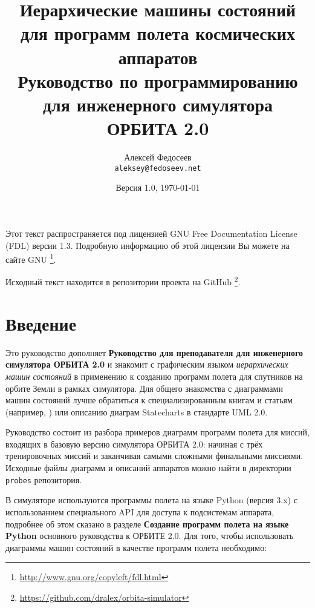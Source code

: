 \documentclass[12pt,a4paper]{article}
\begin{document}
\title{%
  \textbf{Иерархические машины состояний для программ полета космических аппаратов} \\
    Руководство по программированию для инженерного симулятора ОРБИТА 2.0}

\author{
  Алексей Федосеев\\
  \texttt{aleksey@fedoseev.net}
}

\date{Версия 1.0, \today}

\maketitle

Этот текст распространяется под лицензией GNU Free Documentation License (FDL) версии
1.3. Подробную информацию об этой лицензии Вы можете на сайте GNU
\footnote{\url{http://www.gnu.org/copyleft/fdl.html}}.

Исходный текст находится в репозитории проекта на GitHub
\footnote{\url{https://github.com/dralex/orbita-simulator}}.

\tableofcontents

\clearpage
\section{Введение}

Это руководство дополняет \textbf{Руководство для преподавателя для инженерного симулятора
  ОРБИТА 2.0} и знакомит с графическим языком \emph{иерархических машин состояний} в
применению к созданию программ полета для спутников на орбите Земли в рамках
симулятора. Для общего знакомства с диаграммами машин состояний лучше обратиться к
специализированным книгам и статьям (например, \cite{CRASHCOURSE}) или описанию диаграм
Statecharts в стандарте UML 2.0.

Руководство состоит из разбора примеров диаграмм программ полета для миссий, входящих в
базовую версию симулятора ОРБИТА 2.0: начиная с трёх тренировочных миссий и заканчивая
самыми сложными финальными миссиями. Исходные файлы диаграмм и описаний аппаратов можно
найти в директории \verb'probes' репозитория.

В симуляторе используются программы полета на языке Python (версия 3.x) с использованием
специального API для доступа к подсистемам аппарата, подробнее об этом сказано в разделе
\textbf{Создание программ полета на языке Python} основного руководства к ОРБИТЕ 2.0. Для
того, чтобы использовать диаграммы машин состояний в качестве программ полета необходимо:
\end{document}

